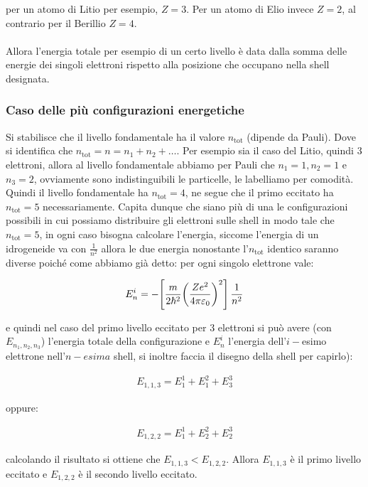 	per un atomo di Litio per esempio, $Z = 3$. Per un atomo di Elio invece $Z= 2$, al contrario per il Berillio $Z = 4$.
	\\
	\\
	Allora l'energia totale per esempio di un certo livello è data dalla somma delle energie dei singoli elettroni rispetto alla posizione che occupano nella shell designata.
	
\subsubsection{Caso delle più configurazioni energetiche}

	Si stabilisce che il livello fondamentale ha il valore $n_{\text{tot}}$ (dipende da Pauli). Dove si identifica che $n_{\text{tot}} = n = n_1 + n_2 + \ldots$. Per esempio sia il caso del Litio, quindi $3$ elettroni, allora al livello fondamentale abbiamo per Pauli che $n_1 = 1, n_2 = 1$ e $n_3 = 2$, ovviamente sono indistinguibili le particelle, le labelliamo per comodità. Quindi il livello fondamentale ha $n_{\text{tot}} = 4$, ne segue che il primo eccitato ha $n_{\text{tot}} = 5 $ necessariamente. Capita dunque che siano più di una le configurazioni possibili in cui possiamo distribuire gli elettroni sulle shell in modo tale che $n_{\text{tot}}= 5$, in ogni caso bisogna calcolare l'energia, siccome l'energia di un idrogeneide va con $\frac{1}{n^2}$ allora le due energia nonostante l'$n_{\text{tot}}$ identico saranno diverse poiché come abbiamo già detto: per ogni singolo elettrone vale:
	
\begin{align*}
	E^i_n = - \qty[\frac{m}{2\hbar^2} \qty(\frac{Z e^2}{4\pi \varepsilon_0})^2] \, \frac{1}{n^2}
\end{align*}

	e quindi nel caso del primo livello eccitato per $3$ elettroni si può avere (con $E_{n_1, n_2, n_3}$) l'energia totale della configurazione e $E^i_n$ l'energia dell'$i-$esimo elettrone nell'$n-esima$ shell, si inoltre faccia il disegno della shell per capirlo):
	
\begin{align*}
	E_{1 , 1, 3} = E^1_1 + E^2_1 + E^3_3
\end{align*}

	oppure:
	
\begin{align*}
	E_{1 , 2, 2} = E^1_1 + E^2_2 + E^3_2
\end{align*}
	
	calcolando il risultato si ottiene che $E_{1 , 1, 3} < E_{1 , 2, 2}$. Allora $E_{1 , 1, 3}$ è il primo livello eccitato e $E_{1 , 2, 2}$ è il secondo livello eccitato.


